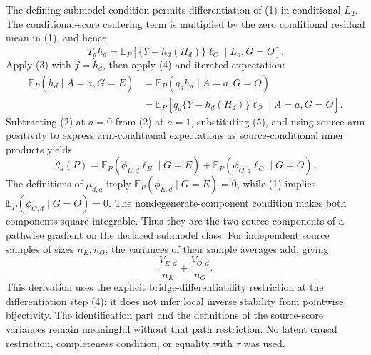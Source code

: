 The defining submodel condition permits differentiation of (1) in conditional \(L_2\).  The conditional-score centering term is multiplied by the zero conditional residual mean in (1), and hence
\[
 T_d\dot h_d
 ={\mathbb E}_P[\{Y-h_d(H_d)\}\ell_O\mid L_d,G=O]. \tag{4}
\]
Apply (3) with \(f=\dot h_d\), then apply (4) and iterated expectation:
\[
\begin{aligned}
 {\mathbb E}_P(\dot h_d\mid A=a,G=E)
 &={\mathbb E}_P(q_d\dot h_d\mid A=a,G=O)\\
 &={\mathbb E}_P[q_d\{Y-h_d(H_d)\}\ell_O\mid A=a,G=O]. \tag{5}
\end{aligned}
\]
Subtracting (2) at \(a=0\) from (2) at \(a=1\), substituting (5), and using source-arm positivity to express arm-conditional expectations as source-conditional inner products yields
\[
 \dot\theta_d(P)
 ={\mathbb E}_P(\phi_{E,d}\ell_E\mid G=E)
  +{\mathbb E}_P(\phi_{O,d}\ell_O\mid G=O). \tag{6}
\]
The definitions of \(\mu_{d,a}\) imply \({\mathbb E}_P(\phi_{E,d}\mid G=E)=0\), while (1) implies \({\mathbb E}_P(\phi_{O,d}\mid G=O)=0\).  The nondegenerate-component condition makes both components square-integrable.  Thus they are the two source components of a pathwise gradient on the declared submodel class.  For independent source samples of sizes \(n_E,n_O\), the variances of their sample averages add, giving
\[
 \frac{V_{E,d}}{n_E}+\frac{V_{O,d}}{n_O}. \tag{7}
\]
This derivation uses the explicit bridge-differentiability restriction at the differentiation step (4); it does not infer local inverse stability from pointwise bijectivity.  The identification part and the definitions of the source-score variances remain meaningful without that path restriction.  No latent causal restriction, completeness condition, or equality with \(\tau\) was used.